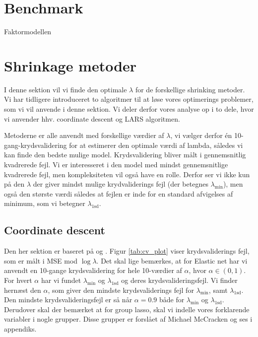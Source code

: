 \section{Benchmark}
Faktormodellen


\section{Shrinkage metoder}
I denne sektion vil vi finde den optimale $\lambda$ for de forskellige shrinking metoder. 
Vi har tidligere introduceret to algoritmer til at løse vores optimerings problemer, som vi vil anvende i denne sektion.
Vi deler derfor vores analyse op i to dele, hvor vi anvender hhv. coordinate descent og LARS algoritmen.

Metoderne er alle anvendt med forskellige værdier af $\lambda$, vi vælger derfor én 10-gang-krydsvalidering for at estimerer den optimale værdi af lambda, således vi kan finde den bedste mulige model. 
Krydsvalidering bliver målt i gennemsnitlig kvadrerede fejl. 
Vi er interesseret i den model med mindst gennemsnitlige kvadrerede fejl, men kompleksiteten vil også have en rolle.
Derfor ser vi ikke kun på den $\lambda$ der giver mindst mulige krydvaliderings fejl (der betegnes $\lambda_{\min}$), men også den største værdi således at fejlen er inde for en standard afvigelses af minimum, som vi betegner $\lambda_{\text{1sd}}$.  

\subsection{Coordinate descent}
Den her sektion er baseret på  \citep{glmnet} og  \citep{gglasso}.
Figur \ref{tab:cv_plot} viser krydsvaliderings fejl, som er målt i MSE mod $\log \lambda$. 
Det skal lige bemærkes, at for Elastic net har vi anvendt en 10-gange krydsvalidering for hele 10-værdier af $\alpha$, hvor $\alpha \in (0,1)$. 
For hvert $\alpha$ har vi fundet $\lambda_{\min}$ og $\lambda_{1\text{sd}}$ og deres krydsvalideringsfejl. Vi finder hernæst den $\alpha$, som giver den mindste krydsvaliderings fejl for $\lambda_{\min}$, samt $\lambda_{1\text{sd}}$. 
Den mindste krydsvalideringsfejl er så når  $\alpha = 0.9$ både for $\lambda_{\min}$ og $\lambda_{1\text{sd}}$. 
Derudover skal der bemærket at for group lasso, skal vi indelle vores forklarende variabler i nogle grupper. Disse grupper er forslået af Michael McCracken og ses i appendiks.


